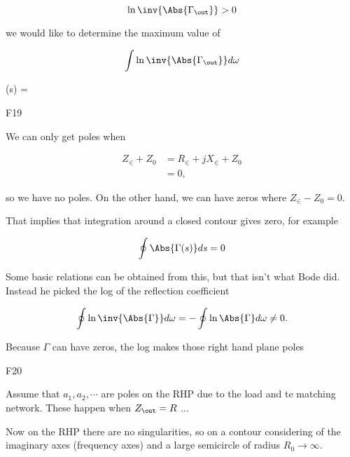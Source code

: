 \begin{equation}\label{eqn:uwavesDeck8ResonatorQfactorCore:n}
\ln \inv{\Abs{\Gamma_\out}} > 0
\end{equation}

we would like to determine the maximum value of

\begin{equation}\label{eqn:uwavesDeck8ResonatorQfactorCore:n}
\int
\ln \inv{\Abs{\Gamma_\out}} d\omega
\end{equation}

\Gamma(s) = 

F19

We can only get poles when

\begin{equation}\label{eqn:uwavesDeck8ResonatorQfactorCore:n}
\begin{aligned}
Z_\in + Z_0 &= R_\in + j X_\in + Z_0 \\ &= 0,
\end{aligned}
\end{equation}

so we have no poles.  On the other hand, we can have zeros where \( Z_\in - Z_0 = 0 \).

That implies that integration around a closed contour gives zero, for example

\begin{equation}\label{eqn:uwavesDeck8ResonatorQfactorCore:n}
\oint \Abs{ \Gamma(s) } ds = 0
\end{equation}

Some basic relations can be obtained from this, but that isn't what Bode did.  Instead he picked the log of the reflection coefficient

\begin{equation}\label{eqn:uwavesDeck8ResonatorQfactorCore:n}
\oint
\ln \inv{\Abs{\Gamma}} d\omega
=
-\oint
\ln \Abs{\Gamma} d\omega
\ne 0.
\end{equation}

Because \( \Gamma \) can have zeros, the log makes those right hand plane poles

F20

Assume that \( a_1, a_2, \cdots \) are poles on the RHP due to the load and te matching network.  These happen when \( Z_\out = R \)
...

Now on the RHP there are no singularities, so on a contour considering of the imaginary axes (frequency axes) and a large semicircle of radius \( R_0 \rightarrow \infty \).

